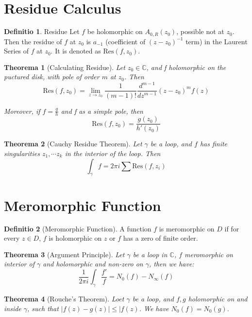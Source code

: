 \documentclass[12pt, a4paper]{article}
\newtheorem{theorem}{Theorema}[section]
\theoremstyle{definition}
\newtheorem{definition}{Definitio}[section]
\theoremstyle{remark}
\newcommand{\bb}[1]{\mathbb{#1}}
\newcommand{\res}{\text{Res}}
\begin{document}
\section{Residue Calculus}

\begin{definition}{Residue}
	Let $f$ be holomorphic on $A_{0,R}(z_0)$, possible not at $z_0$. Then the residue of $f$ at $z_0$ is $a_{-1}$ (coefficient of $(z-z_0)^{-1}$ term) in the Laurent Series of $f$ at $z_0$. It is denoted as $\res(f, z_0)$.
\end{definition}

\begin{theorem}[Calculating Residue]
  Let $z_0 \in \bb{C}$, and f holomorphic on the puctured disk, with pole of order $m$ at $z_0$. Then 
  \[
    \res(f, z_0) = \lim _{z \rightarrow z_0} \frac{1}{(m-1)!} \frac{d^{m-1}}{dz^{m-1}}(z-z_0)^mf(z)
  \]

  Moreover, if $f = \frac{g}{h}$ and f as a simple pole, then 
  \[
    \res(f, z_0) = \frac{g(z_0)}{h'(z_0)}
  \]
\end{theorem}

\begin{theorem}[Cauchy Residue Theorem]
  Let $\gamma$ be a loop, and $f$ has finite singularities $z_1, \cdots z_k$ in the interior of the loop. Then 
  \[
    \int_{\gamma} f = 2\pi i \sum \res(f, z_i)
  \]
\end{theorem}

\section{Meromorphic Function} %
\label{sec:Meromorphic Function}


\begin{definition}[Meromorphic Function]
  A function $f$ is meromorphic on $D$ if for every $z \in D$, $f$ is holomorphic on $z$ or $f$ has a zero of finite order. 
\end{definition}

\begin{theorem}[Argument Principle]
  Let $\gamma$ be a loop in $\bb{C}$, $f$ meromorphic on interior of $\gamma$ and holomorphic and non-zero on $\gamma$, then we have: 
  \[
    \frac{1}{2\pi i} \int_{\gamma} \frac{f'}{f} = N_0(f) - N_{\infty}(f)
  \]
\end{theorem}

\begin{theorem}[Rouche's Theorem]
  Loet $\gamma$ be a loop, and $f,g$ holomorphic on and inside $\gamma$, such that $|f(z) - g(z)| \leq |f(z)$. We have $N_0(f) = N_0(g)$.
\end{theorem}
\end{document}

